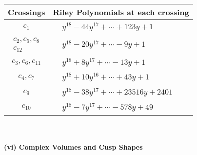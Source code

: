 \documentclass[1p]{elsarticle_modified}
\theoremstyle{definition}
\begin{document}
\begin{tabular}{m{50pt}|m{274pt}}
Crossings & \hspace{64pt}Riley Polynomials at each crossing \\
\hline $$\begin{aligned}c_{1}\end{aligned}$$&$\begin{aligned}
&y^{18}-44 y^{17}+\cdots+123 y+1
\end{aligned}$\\
\hline $$\begin{aligned}c_{2},c_{5},c_{8}\\c_{12}\end{aligned}$$&$\begin{aligned}
&y^{18}-20 y^{17}+\cdots-9 y+1
\end{aligned}$\\
\hline $$\begin{aligned}c_{3},c_{6},c_{11}\end{aligned}$$&$\begin{aligned}
&y^{18}+8 y^{17}+\cdots-13 y+1
\end{aligned}$\\
\hline $$\begin{aligned}c_{4},c_{7}\end{aligned}$$&$\begin{aligned}
&y^{18}+10 y^{16}+\cdots+43 y+1
\end{aligned}$\\
\hline $$\begin{aligned}c_{9}\end{aligned}$$&$\begin{aligned}
&y^{18}-38 y^{17}+\cdots+23516 y+2401
\end{aligned}$\\
\hline $$\begin{aligned}c_{10}\end{aligned}$$&$\begin{aligned}
&y^{18}-7 y^{17}+\cdots-578 y+49
\end{aligned}$\\
\hline
\end{tabular}\\~\\
\newpage\flushleft \textbf{(vi) Complex Volumes and Cusp Shapes}
\end{document}
